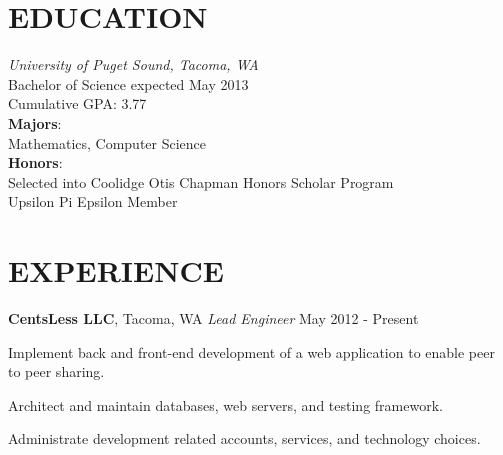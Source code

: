 \documentclass[line,margin]{res}
\newenvironment{itemize*}%
  {\begin{itemize}%
    \setlength{\parsep}{0pt}
    \setlength{\itemsep}{0pt}%
    \setlength{\parskip}{0pt}}%
  {\end{itemize}}
\begin{document}
\address{2214 N. Washington Street, Tacoma, WA 98406} 
\address{kwenholz@pugetsound.edu\hspace*{2mm} \vline \hspace*{2mm} (406)546-9210}

 
\begin{resume}
\vspace*{.3cm}

\section{EDUCATION} {\sl University of Puget Sound, Tacoma, WA} \\
                Bachelor of Science
                expected May 2013 \\
                Cumulative GPA: 3.77\\
                \textbf{Majors}: \\
\hspace*{5mm}                Mathematics, Computer Science \\
                \textbf{Honors}:\\
\hspace*{5mm}   Selected into Coolidge Otis Chapman Honors Scholar Program\\
\hspace*{5mm}   Upsilon Pi Epsilon Member\\

\vspace*{.2cm}

\section{EXPERIENCE} 

\textbf{CentsLess LLC}, Tacoma, WA
{\sl Lead Engineer} \hfill May 2012 - Present
\begin{itemize*}
    \item Implement back and front-end development of a web application
        to enable peer to peer sharing.
    \item Architect and maintain databases, web servers, and testing framework.
    \item Administrate development related accounts, services, and technology
        choices.
\end{itemize*}


\end{resume}
\end{document}
